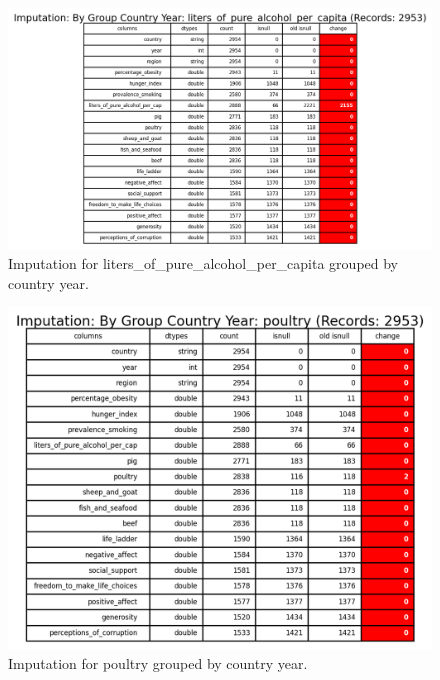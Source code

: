                 \begin{figure}[H]
                        \centering
                        \includegraphics[scale=1]{images/dp_imputation_c_y_liters_of_pure_alcohol_per_capita}
                        \caption{Imputation for liters\_of\_pure\_alcohol\_per\_capita grouped by country year.}
                        \label{fig:dp-impute-group-country-alcohol}
                \end{figure}

                \begin{figure}[H]
                        \centering
                        \includegraphics[scale=1]{images/dp_imputation_c_y_poultry}
                        \caption{Imputation for poultry grouped by country year.}
                        \label{fig:dp-impute-group-poultry}
                \end{figure}

